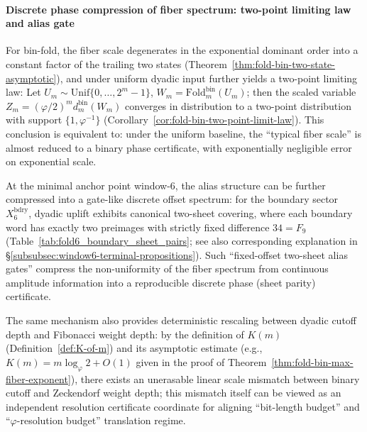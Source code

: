 \paragraph{Discrete phase compression of fiber spectrum: two-point limiting law and alias gate}
For bin-fold, the fiber scale degenerates in the exponential dominant order into a constant factor of the trailing two states (Theorem~\ref{thm:fold-bin-two-state-asymptotic}), and under uniform dyadic input further yields a two-point limiting law:
Let \(U_m\sim\mathrm{Unif}\{0,\dots,2^m-1\}\), \(W_m=\mathrm{Fold}^{\mathrm{bin}}_m(U_m)\); then the scaled variable
\(
Z_m=(\varphi/2)^m d^{\mathrm{bin}}_m(W_m)
\)
converges in distribution to a two-point distribution with support \(\{1,\varphi^{-1}\}\) (Corollary~\ref{cor:fold-bin-two-point-limit-law}).
This conclusion is equivalent to: under the uniform baseline, the ``typical fiber scale'' is almost reduced to a binary phase certificate, with exponentially negligible error on exponential scale.
\par
At the minimal anchor point window-\(6\), the alias structure can be further compressed into a gate-like discrete offset spectrum:
for the boundary sector \(X_6^{\mathrm{bdry}}\), dyadic uplift exhibits canonical two-sheet covering, where each boundary word has exactly two preimages with strictly fixed difference \(34=F_9\) (Table~\ref{tab:fold6_boundary_sheet_pairs}; see also corresponding explanation in \S\ref{subsubsec:window6-terminal-propositions}).
Such ``fixed-offset two-sheet alias gates'' compress the non-uniformity of the fiber spectrum from continuous amplitude information into a reproducible discrete phase (sheet parity) certificate.
\par
The same mechanism also provides deterministic rescaling between dyadic cutoff depth and Fibonacci weight depth: by the definition of \(K(m)\) (Definition~\ref{def:K-of-m}) and its asymptotic estimate (e.g., \(K(m)=m\log_\varphi 2+O(1)\) given in the proof of Theorem~\ref{thm:fold-bin-max-fiber-exponent}), there exists an unerasable linear scale mismatch between binary cutoff and Zeckendorf weight depth; this mismatch itself can be viewed as an independent resolution certificate coordinate for aligning ``bit-length budget'' and ``\(\varphi\)-resolution budget'' translation regime.


